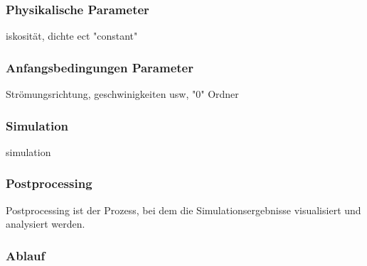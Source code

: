 \subsubsection{Physikalische Parameter\label{openfoam:section:Physikalische Parameter}}
iskosität, dichte ect "constant"

\subsubsection{Anfangsbedingungen Parameter\label{openfoam:section:Anfangsbedingungen Parameter}}
Strömungsrichtung, geschwinigkeiten usw, "0" Ordner

\subsubsection{Simulation\label{openfoam:section:Simulation}}
simulation



\subsubsection{Postprocessing}
Postprocessing ist der Prozess, bei dem die Simulationsergebnisse visualisiert und analysiert werden. 


\subsubsection{Ablauf\label{openfoam:section:Ablauf}}

